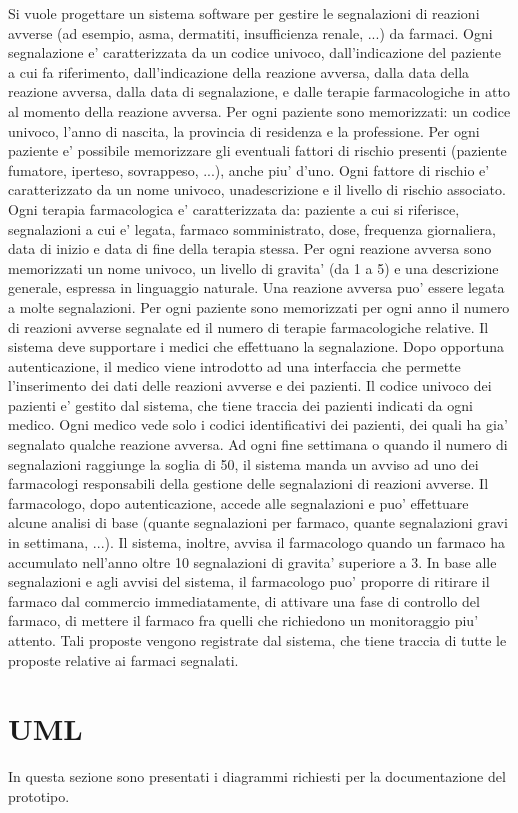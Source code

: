 \documentclass[a4paper]{article}
\begin{document}
	\begin{changemargin}{1cm}{0.5cm}
		Si vuole progettare un sistema software per gestire le segnalazioni di reazioni avverse (ad esempio, asma, dermatiti, insufficienza renale, ...) da farmaci. Ogni segnalazione e' caratterizzata da un codice univoco, dall'indicazione del paziente a cui fa riferimento, dall'indicazione della reazione avversa, dalla data della reazione avversa, dalla data di segnalazione, e dalle terapie farmacologiche in atto al momento della reazione avversa. Per ogni paziente sono memorizzati: un codice univoco, l'anno di nascita, la provincia di residenza e la professione. Per ogni paziente e' possibile memorizzare gli eventuali fattori di rischio presenti (paziente fumatore, iperteso, sovrappeso, ...), anche piu' d'uno. Ogni fattore di rischio e' caratterizzato da un nome univoco, unadescrizione e il livello di rischio associato. Ogni terapia farmacologica e' caratterizzata da: paziente a cui si riferisce, segnalazioni a cui e' legata, farmaco somministrato, dose, frequenza giornaliera, data di inizio e data di fine della terapia stessa. Per ogni reazione avversa sono memorizzati un nome univoco, un livello di gravita' (da 1 a 5) e una descrizione generale, espressa in linguaggio naturale. Una reazione avversa puo' essere legata a molte segnalazioni. Per ogni paziente sono memorizzati per ogni anno il numero di reazioni avverse segnalate ed il numero di terapie farmacologiche relative. Il sistema deve supportare i medici che effettuano la segnalazione. Dopo opportuna autenticazione, il medico viene introdotto ad una interfaccia che permette l'inserimento dei dati delle reazioni avverse e dei pazienti. Il codice univoco dei pazienti e' gestito dal sistema, che tiene traccia dei pazienti indicati da ogni medico. Ogni medico vede solo i codici identificativi dei pazienti, dei quali ha gia' segnalato qualche reazione avversa. Ad ogni fine settimana o quando il numero di segnalazioni raggiunge la soglia di 50, il sistema manda un avviso ad uno dei farmacologi responsabili della gestione delle segnalazioni di reazioni avverse. Il farmacologo, dopo autenticazione, accede alle segnalazioni e puo' effettuare alcune analisi di base (quante segnalazioni per farmaco, quante segnalazioni gravi in settimana, ...). Il sistema, inoltre, avvisa il farmacologo quando un farmaco ha accumulato nell'anno oltre 10 segnalazioni di gravita' superiore a 3. In base alle segnalazioni e agli avvisi del sistema, il farmacologo puo' proporre di ritirare il farmaco dal commercio immediatamente, di attivare una fase di controllo del farmaco, di mettere il farmaco fra quelli che richiedono un monitoraggio piu' attento. Tali proposte vengono registrate dal sistema, che tiene traccia di tutte le proposte relative ai farmaci segnalati.
	\end{changemargin}
	
	\section{UML}
		In questa sezione sono presentati i diagrammi richiesti per la documentazione del prototipo.
		
		
\end{document}
